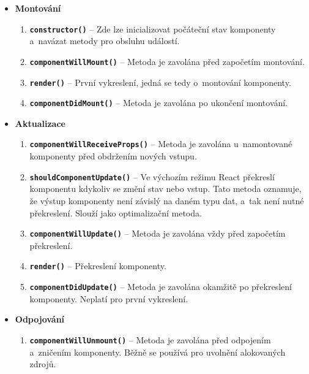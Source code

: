 \begin{itemize}
    \item \textbf{Montování}
        \begin{enumerate}
            \item \textbf{\texttt{constructor()}} -- Zde lze inicializovat počáteční stav komponenty a~navázat metody pro obsluhu událostí.
            \item \textbf{\texttt{componentWillMount()}} -- Metoda je zavolána před započetím montování.
            \item \textbf{\texttt{render()}} -- První vykreslení, jedná se tedy o~montování komponenty.
            \item \textbf{\texttt{componentDidMount()}} -- Metoda je zavolána po ukončení montování.
        \end{enumerate}
    \clearpage
    \item \textbf{Aktualizace}
        \begin{enumerate}
            \item \textbf{\texttt{componentWillReceiveProps()}} -- Metoda je zavolána u~namontované komponenty před obdržením nových vstupu.
            \item \textbf{\texttt{shouldComponentUpdate()}} -- Ve výchozím režimu React překreslí komponentu kdykoliv se změní stav nebo vstup. Tato metoda oznamuje, že výstup komponenty není závislý na daném typu dat, a~tak není nutné překreslení. Slouží jako optimalizační metoda.
            \item \textbf{\texttt{componentWillUpdate()}} -- Metoda je zavolána vždy před započetím překreslení.
            \item \textbf{\texttt{render()}} -- Překreslení komponenty.
            \item \textbf{\texttt{componentDidUpdate()}} -- Metoda je zavolána okamžitě po překreslení komponenty. Neplatí pro první vykreslení.
        \end{enumerate}
    \item \textbf{Odpojování}
        \begin{enumerate}
            \item \textbf{\texttt{componentWillUnmount()}} -- Metoda je zavolána před odpojením a~zničením komponenty. Běžně se používá pro uvolnění alokovaných zdrojů.
        \end{enumerate}
\end{itemize}
